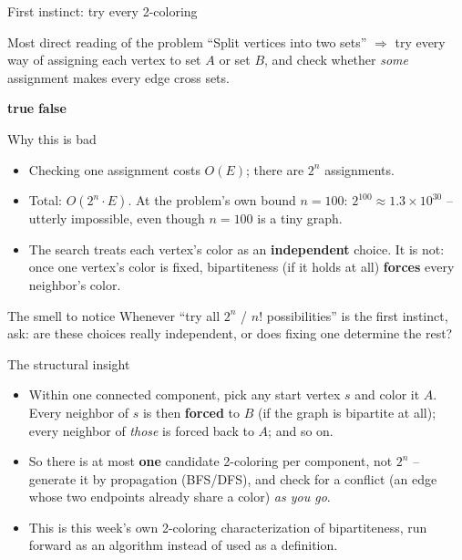 \documentclass[11pt,aspectratio=169]{beamer}
\begin{document}
\begin{frame}{First instinct: try every 2-coloring}
  \begin{block}{Most direct reading of the problem}
    ``Split vertices into two sets'' $\Rightarrow$ try every way of assigning each
    vertex to set $A$ or set $B$, and check whether \emph{some} assignment makes every
    edge cross sets.
  \end{block}
  \begin{algorithmic}[1]
        \State \Return \textbf{true}
      \EndIf
    \EndFor
    \State \Return \textbf{false}
  \end{algorithmic}
\end{frame}

\begin{frame}{Why this is bad}
  \begin{itemize}
    \item Checking one assignment costs $O(E)$; there are $2^n$ assignments.
    \item Total: $O(2^n \cdot E)$. At the problem's own bound $n=100$: $2^{100}
    \approx 1.3\times10^{30}$ -- utterly impossible, even though $n=100$ is a tiny
    graph.
    \item The search treats each vertex's color as an \textbf{independent} choice.
    It is not: once one vertex's color is fixed, bipartiteness (if it holds at all)
    \textbf{forces} every neighbor's color.
  \end{itemize}
  \begin{alertblock}{The smell to notice}
    Whenever ``try all $2^n$ / $n!$ possibilities'' is the first instinct, ask: are
    these choices really independent, or does fixing one determine the rest?
  \end{alertblock}
\end{frame}

\begin{frame}{The structural insight}
  \begin{itemize}
    \item Within one connected component, pick any start vertex $s$ and color it $A$.
    Every neighbor of $s$ is then \textbf{forced} to $B$ (if the graph is bipartite at
    all); every neighbor of \emph{those} is forced back to $A$; and so on.
    \item So there is at most \textbf{one} candidate 2-coloring per component, not
    $2^n$ -- generate it by propagation (BFS/DFS), and check for a conflict (an edge
    whose two endpoints already share a color) \emph{as you go}.
    \item This is this week's own 2-coloring characterization of bipartiteness, run
    forward as an algorithm instead of used as a definition.
  \end{itemize}
\end{frame}
\end{document}

